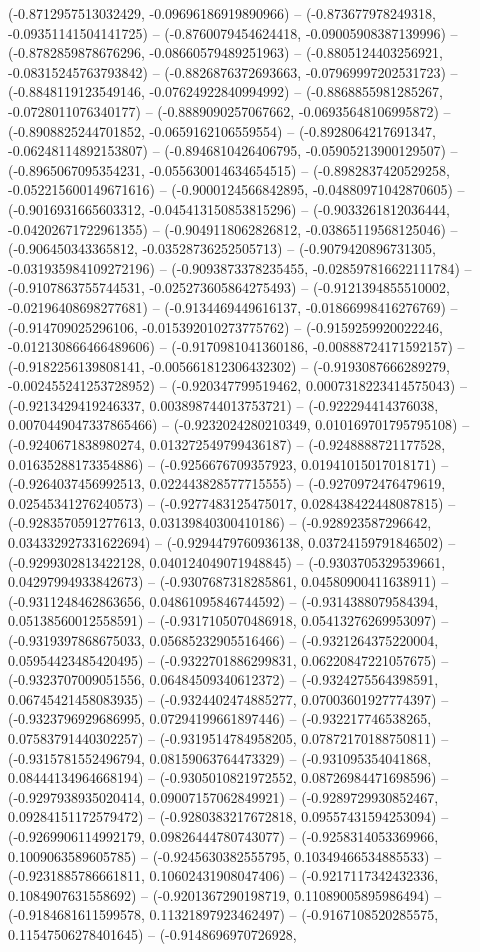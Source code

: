 (-0.8712957513032429, -0.09696186919890966) -- (-0.873677978249318, -0.09351141504141725) -- (-0.8760079454624418, -0.09005908387139996) -- (-0.8782859878676296, -0.08660579489251963) -- (-0.8805124403256921, -0.08315245763793842) -- (-0.8826876372693663, -0.07969997202531723) -- (-0.8848119123549146, -0.07624922840994992) -- (-0.8868855981285267, -0.0728011076340177) -- (-0.8889090257067662, -0.06935648106995872) -- (-0.8908825244701852, -0.0659162106559554) -- (-0.8928064217691347, -0.06248114892153807) -- (-0.8946810426406795, -0.05905213900129507) -- (-0.8965067095354231, -0.055630014634654515) -- (-0.8982837420529258, -0.052215600149671616) -- (-0.9000124566842895, -0.04880971042870605) -- (-0.9016931665603312, -0.045413150853815296) -- (-0.9033261812036444, -0.04202671722961355) -- (-0.9049118062826812, -0.03865119568125046) -- (-0.906450343365812, -0.03528736252505713) -- (-0.9079420896731305, -0.031935984109272196) -- (-0.9093873378235455, -0.028597816622111784) -- (-0.9107863755744531, -0.025273605864275493) -- (-0.9121394855510002, -0.02196408698277681) -- (-0.9134469449616137, -0.01866998416276769) -- (-0.914709025296106, -0.015392010273775762) -- (-0.9159259920022246, -0.012130866466489606) -- (-0.9170981041360186, -0.00888724171592157) -- (-0.9182256139808141, -0.005661812306432302) -- (-0.9193087666289279, -0.002455241253728952) -- (-0.920347799519462, 0.0007318223414575043) -- (-0.9213429419246337, 0.003898744013753721) -- (-0.922294414376038, 0.0070449047337865466) -- (-0.9232024280210349, 0.010169701795795108) -- (-0.9240671838980274, 0.013272549799436187) -- (-0.9248888721177528, 0.01635288173354886) -- (-0.9256676709357923, 0.01941015017018171) -- (-0.9264037456992513, 0.022443828577715555) -- (-0.9270972476479619, 0.02545341276240573) -- (-0.9277483125475017, 0.028438422448087815) -- (-0.9283570591277613, 0.03139840300410186) -- (-0.928923587296642, 0.034332927331622694) -- (-0.9294479760936138, 0.03724159791846502) -- (-0.9299302813422128, 0.040124049071948845) -- (-0.9303705329539661, 0.04297994933842673) -- (-0.9307687318285861, 0.04580900411638911) -- (-0.9311248462863656, 0.04861095846744592) -- (-0.9314388079584394, 0.05138560012558591) -- (-0.9317105070486918, 0.05413276269953097) -- (-0.9319397868675033, 0.05685232905516466) -- (-0.9321264375220004, 0.05954423485420495) -- (-0.9322701886299831, 0.06220847221057675) -- (-0.9323707009051556, 0.06484509340612372) -- (-0.9324275564398591, 0.06745421458083935) -- (-0.9324402474885277, 0.07003601927774397) -- (-0.9323796929686995, 0.07294199661897446) -- (-0.932217746538265, 0.07583791440302257) -- (-0.9319514784958205, 0.07872170188750811) -- (-0.9315781552496794, 0.08159063764473329) -- (-0.931095354041868, 0.08444134964668194) -- (-0.9305010821972552, 0.08726984471698596) -- (-0.9297938935020414, 0.09007157062849921) -- (-0.9289729930852467, 0.09284151172579472) -- (-0.9280383217672818, 0.09557431594253094) -- (-0.9269906114992179, 0.09826444780743077) -- (-0.9258314053369966, 0.1009063589605785) -- (-0.9245630382555795, 0.10349466534885533) -- (-0.9231885786661811, 0.10602431908047406) -- (-0.9217117342432336, 0.1084907631558692) -- (-0.9201367290198719, 0.11089005895986494) -- (-0.9184681611599578, 0.11321897923462497) -- (-0.9167108520285575, 0.11547506278401645) -- (-0.9148696970726928, 